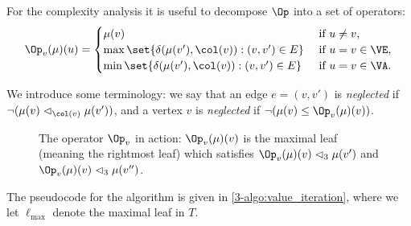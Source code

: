 For the complexity analysis it is useful to decompose $\Op$ into a set of operators:
\[
\Op_v(\mu)(u) = 
\begin{cases}
\mu(v) & \text{ if } u \neq v, \\
\max \set{\delta( \mu(v'), \col(v)) : (v,v') \in E} & \text{ if } u = v \in \VE, \\
\min \set{\delta( \mu(v'), \col(v)) : (v,v') \in E} & \text{ if } u = v \in \VA.
\end{cases}
\]

We introduce some terminology: we say that an edge $e = (v,v')$ is \textit{neglected} if $\neg (\mu(v) \vartriangleleft_{\col(v)} \mu(v'))$,
and a vertex $v$ is \textit{neglected} if $\neg (\mu(v) \le \Op_v(\mu)(v))$.

\begin{figure}[!ht]
\centering
{}
\caption{The operator $\Op_v$ in action: $\Op_v(\mu)(v)$ is the maximal leaf (meaning the rightmost leaf) 
which satisfies $\Op_v(\mu)(v) \vartriangleleft_3 \mu(v')$ and $\Op_v(\mu)(v) \vartriangleleft_3 \mu(v'')$.}
\label{3-fig:lifting}
\end{figure}

The pseudocode for the algorithm is given in \cref{3-algo:value_iteration}, 
where we let $\ell_{\max}$ denote the maximal leaf in $T$.

